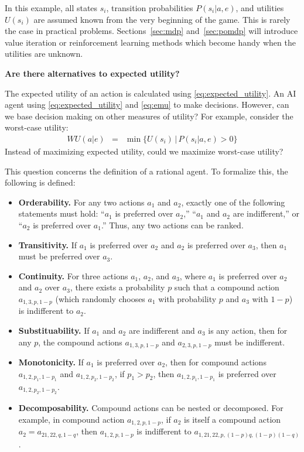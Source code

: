 In this example, all states $s_i$, transition probabilities $P(s_i|a,e)$, and utilities $U(s_i)$ are assumed known from the very beginning of the game. This is rarely the case in practical problems. Sections~\ref{sec:mdp} and~\ref{sec:pomdp} will introduce value iteration or reinforcement learning methods which become handy when the utilities are unknown.

\begin{mdframed}
	\noindent \textbf{Are there alternatives to expected utility?}
	
	The expected utility of an action is calculated using \eqref{eq:expected_utility}. An AI agent using \eqref{eq:expected_utility} and \eqref{eq:emu} to make decisions. However, can we base decision making on other measures of utility? For example, consider the worst-case utility:
	\begin{eqnarray}
		WU(a|e) &=& \min\{U(s_i)\,|\,P(s_i|a,e) > 0\} \nonumber
	\end{eqnarray}
	Instead of maximizing expected utility, could we maximize worst-case utility?
	
	This question concerns the definition of a rational agent. To formalize this, the following  is defined:
	\begin{itemize}
		\item \textbf{Orderability.} For any two actions $a_1$ and $a_2$, exactly one of the following statements must hold: “$a_1$ is preferred over $a_2$,” “$a_1$ and $a_2$ are indifferent,” or “$a_2$ is preferred over $a_1$.” Thus, any two actions can be ranked.
		\item \textbf{Transitivity.} If $a_1$ is preferred over $a_2$ and $a_2$ is preferred over $a_3$, then $a_1$ must be preferred over $a_3$.
		\item \textbf{Continuity.} For three actions $a_1$, $a_2$, and $a_3$, where $a_1$ is preferred over $a_2$ and $a_2$ over $a_3$, there exists a probability $p$ such that a compound action $a_{1,3,p,1-p}$ (which randomly chooses $a_1$ with probability $p$ and $a_3$ with $1-p$) is indifferent to $a_2$.
		\item \textbf{Substituability.} If $a_1$ and $a_2$ are indifferent and $a_3$ is any action, then for any $p$, the compound actions $a_{1,3,p,1-p}$ and $a_{2,3,p,1-p}$ must be indifferent.
		\item \textbf{Monotonicity.} If $a_1$ is preferred over $a_2$, then for compound actions $a_{1,2,p_1,1-p_1}$ and $a_{1,2,p_2,1-p_2}$, if $p_1 > p_2$, then $a_{1,2,p_1,1-p_1}$ is preferred over $a_{1,2,p_2,1-p_2}$.
		\item \textbf{Decomposability.} Compound actions can be nested or decomposed. For example, in compound action $a_{1,2,p,1-p}$, if $a_2$ is itself a compound action $a_2 = a_{21,22,q,1-q}$, then $a_{1,2,p,1-p}$ is indifferent to $a_{1,21,22,p,(1-p)q,(1-p)(1-q)}$.
	\end{itemize}
	

\end{mdframed}
